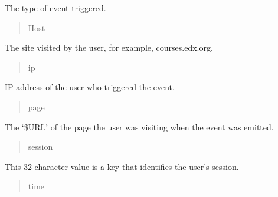 \documentclass[a4paper,12pt,oneside]{sphinxmanual}
\begin{document}
\begin{DUlineblock}{0em}
\item[] The type of event triggered.
\end{DUlineblock}
\begin{quote}\begin{description}
\item[{Host}] \leavevmode
\end{description}\end{quote}

\begin{DUlineblock}{0em}
\item[] The site visited by the user, for example, courses.edx.org.
\end{DUlineblock}
\begin{quote}\begin{description}
\item[{ip}] \leavevmode
\end{description}\end{quote}

\begin{DUlineblock}{0em}
\item[] IP address of the user who triggered the event.
\end{DUlineblock}
\begin{quote}\begin{description}
\item[{page}] \leavevmode
\end{description}\end{quote}

\begin{DUlineblock}{0em}
\item[] The `\$URL' of the page the user was visiting when the event was emitted.
\end{DUlineblock}
\begin{quote}\begin{description}
\item[{session}] \leavevmode
\end{description}\end{quote}

\begin{DUlineblock}{0em}
\item[] This 32-character value is a key that identifies the user's session.
\end{DUlineblock}
\begin{quote}\begin{description}
\item[{time}] \leavevmode
\end{description}\end{quote}
\end{document}
